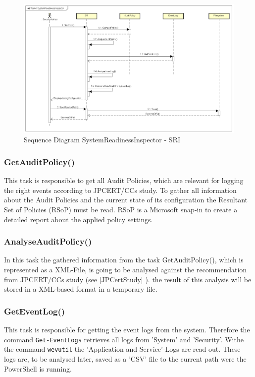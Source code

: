 \begin{figure}[H]
    \centering
    \includegraphics[width=0.8\linewidth]{assets/design-tool/SequenceDiagramSRI.png}
    \caption{Sequence Diagram SystemReadinessInspector - SRI}
\end{figure}

\subsubsection{GetAuditPolicy()}
This task is responsible to get all Audit Policies, which are relevant for logging the right events according to JPCERT/CCs study. To gather all information about the Audit Policies and the current state of its configuration  the Resultant Set of Policies (RSoP) must be read. \cite{RSoP} RSoP is a Microsoft snap-in to create a detailed report about the applied policy settings. 

\subsubsection{AnalyseAuditPolicy()}
In this task the gathered information from the task GetAuditPolicy(), which is represented as a XML-File, is going to be analysed against the recommendation from JPCERT/CCs study (see \ref{JPCertStudy} ). the result of this analysis will be stored in a XML-based format in a temporary file.

\subsubsection{GetEventLog()}
This task is responsible for getting the event logs from the system. Therefore the command \lstinline|Get-EventLogs| \cite{Get-EventLogs} retrieves all logs from 'System' and 'Security'. Withe the command \lstinline|wevutil| the 'Application and Service'-Logs are read out. These logs are, to be analysed later, saved as a 'CSV' file to the current path were the PowerShell is running.

